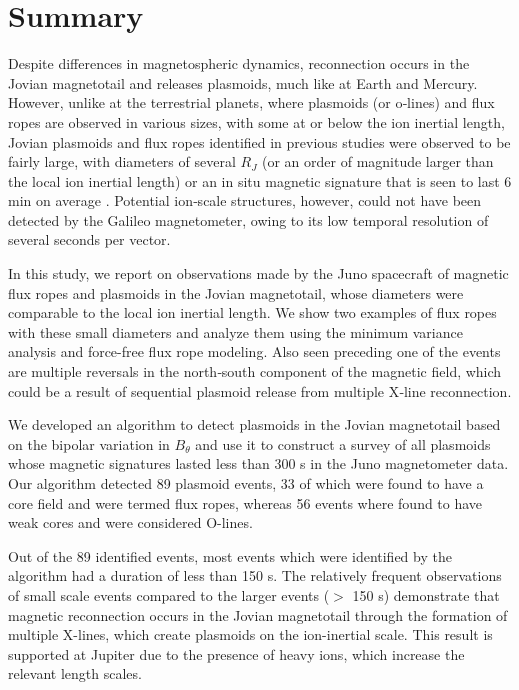 \section{Summary}

Despite differences in magnetospheric dynamics, reconnection occurs in the Jovian magnetotail and releases plasmoids, much like at Earth and Mercury. However, unlike at the terrestrial planets, where plasmoids (or o‐lines) and flux ropes are observed in various sizes, with some at or below the ion inertial length, Jovian plasmoids and flux ropes identified in previous studies were observed to be fairly large, with diameters of several $R_J$ (or an order of magnitude larger than the local ion inertial length) or an in situ magnetic signature that is seen to last 6 min on average \cite{Vogt2014}. Potential ion‐scale structures, however, could not have been detected by the Galileo magnetometer, owing to its low temporal resolution of several seconds per vector.

In this study, we report on observations made by the Juno spacecraft of magnetic flux ropes and plasmoids in the Jovian magnetotail, whose diameters were comparable to the local ion inertial length. We show two examples of flux ropes with these small diameters and analyze them using the minimum variance analysis and force-free flux rope modeling. Also seen preceding one of the events are multiple reversals in the north‐south component of the magnetic field, which could be a result of sequential plasmoid release from multiple X‐line reconnection. 

We developed an algorithm to detect plasmoids in the Jovian magnetotail based on the bipolar variation in $B_\theta$ and use it to construct a survey of all plasmoids whose magnetic signatures lasted less than 300 s in the Juno magnetometer data. Our algorithm detected 89 plasmoid events, 33 of which were found to have a core field and were termed flux ropes, whereas 56 events where found to have weak cores and were considered O-lines. 

Out of the 89 identified events, most events which were identified by the algorithm had a duration of less than 150 s. The relatively frequent observations of small scale events compared to the larger events ($>$ 150 s) demonstrate that magnetic reconnection occurs in the Jovian magnetotail through the formation of multiple X-lines, which create plasmoids on the ion-inertial scale. This result is supported at Jupiter due to the presence of heavy ions, which increase the relevant length scales. 

